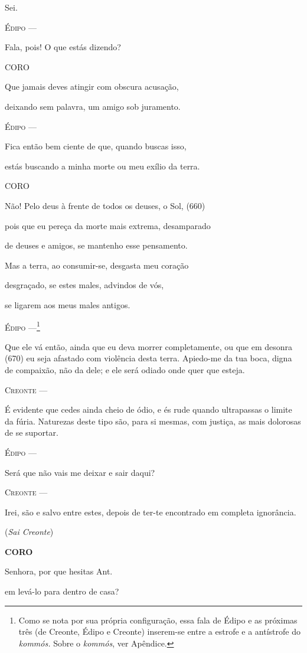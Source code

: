 Sei.

\textsc{Édipo} ---

Fala, pois! O que estás dizendo?

\textsc{CORO}

Que jamais deves atingir com obscura acusação,

deixando sem palavra, um amigo sob juramento.

\textsc{Édipo} ---

Fica então bem ciente de que, quando buscas isso,

estás buscando a minha morte ou meu exílio da terra.

\textsc{CORO}

Não! Pelo deus à frente de todos os deuses, o Sol, (660)

pois que eu pereça da morte mais extrema, desamparado

de deuses e amigos, se mantenho esse pensamento.

Mas a terra, ao consumir-se, desgasta meu coração

desgraçado, se estes males, advindos de vós,

se ligarem aos meus males antigos.

\textsc{Édipo} ---\footnote{Como se nota por sua própria configuração, essa
  fala de Édipo e as próximas três (de Creonte, Édipo e Creonte)
  inserem-se entre a estrofe e a antístrofe do \emph{kommós.} Sobre o
  \emph{kommós}, ver Apêndice.}

Que ele vá então, ainda que eu deva morrer completamente, ou que em
desonra (670) eu seja afastado com violência desta terra. Apiedo-me da
tua boca, digna de compaixão, não da dele; e ele será odiado onde quer
que esteja.

\textsc{Creonte} ---

É evidente que cedes ainda cheio de ódio, e és rude quando ultrapassas o
limite da fúria. Naturezas deste tipo são, para si mesmas, com justiça,
as mais dolorosas de se suportar.

\textsc{Édipo} ---

Será que não vais me deixar e sair daqui?

\textsc{Creonte} ---

Irei, são e salvo entre estes, depois de ter-te encontrado em completa
ignorância.

(\emph{Sai Creonte})

\textbf{CORO }

Senhora, por que hesitas Ant.

em levá-lo para dentro de casa?

